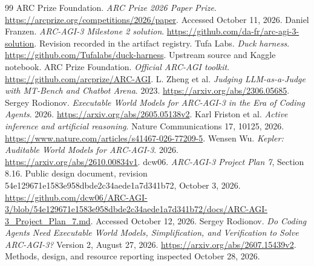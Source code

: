 \documentclass[11pt]{article}
\begin{document}
\begin{thebibliography}{99}
 ARC Prize Foundation. \emph{ARC Prize 2026 Paper Prize}. \url{https://arcprize.org/competitions/2026/paper}. Accessed October 11, 2026.
 Daniel Franzen. \emph{ARC-AGI-3 Milestone 2 solution}. \url{https://github.com/da-fr/arc-agi-3-solution}. Revision recorded in the artifact registry.
 Tufa Labs. \emph{Duck harness}. \url{https://github.com/Tufalabs/duck-harness}. Upstream source and Kaggle notebook.
 ARC Prize Foundation. \emph{Official ARC-AGI toolkit}. \url{https://github.com/arcprize/ARC-AGI}.
 L. Zheng et al. \emph{Judging LLM-as-a-Judge with MT-Bench and Chatbot Arena}. 2023. \url{https://arxiv.org/abs/2306.05685}.
 Sergey Rodionov. \emph{Executable World Models for ARC-AGI-3 in the Era of Coding Agents}. 2026. \url{https://arxiv.org/abs/2605.05138v2}.
 Karl Friston et al. \emph{Active inference and artificial reasoning}. Nature Communications 17, 10125, 2026. \url{https://www.nature.com/articles/s41467-026-77209-5}.
 Wensen Wu. \emph{Kepler: Auditable World Models for ARC-AGI-3}. 2026. \url{https://arxiv.org/abs/2610.00834v1}.
 dcw06. \emph{ARC-AGI-3 Project Plan 7}, Section 8.16. Public design document, revision 54e129671e1583e958dbde2c34aede1a7d341b72, October 3, 2026. \url{https://github.com/dcw06/ARC-AGI-3/blob/54e129671e1583e958dbde2c34aede1a7d341b72/docs/ARC-AGI-3_Project_Plan_7.md}. Accessed October 12, 2026.
 Sergey Rodionov. \emph{Do Coding Agents Need Executable World Models, Simplification, and Verification to Solve ARC-AGI-3?} Version 2, August 27, 2026. \url{https://arxiv.org/abs/2607.15439v2}. Methods, design, and resource reporting inspected October 28, 2026.
\end{thebibliography}
\end{document}
